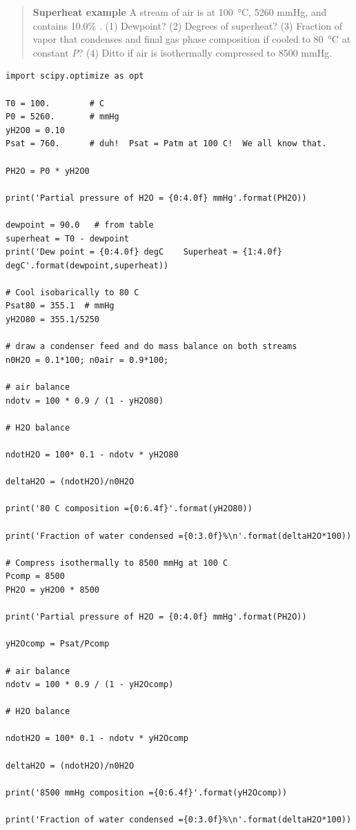 \documentclass[11pt]{article}
\begin{document}
\begin{quote}
\textbf{Superheat example}  A stream of air is at \SI{100}{\celsius}, 5260 mmHg, and contains 10.0\% .  (1) Dewpoint?  (2) Degrees of superheat?  (3) Fraction of vapor that condenses and final gas phase composition if cooled to \SI{80}{\celsius} at constant \emph{P}?  (4) Ditto if air is isothermally compressed to 8500 mmHg.
\end{quote}

\begin{verbatim}
import scipy.optimize as opt

T0 = 100.        # C
P0 = 5260.       # mmHg
yH2O0 = 0.10
Psat = 760.      # duh!  Psat = Patm at 100 C!  We all know that.

PH2O = P0 * yH2O0

print('Partial pressure of H2O = {0:4.0f} mmHg'.format(PH2O))

dewpoint = 90.0   # from table
superheat = T0 - dewpoint
print('Dew point = {0:4.0f} degC    Superheat = {1:4.0f} degC'.format(dewpoint,superheat))

# Cool isobarically to 80 C
Psat80 = 355.1  # mmHg
yH2O80 = 355.1/5250

# draw a condenser feed and do mass balance on both streams
n0H2O = 0.1*100; n0air = 0.9*100;

# air balance
ndotv = 100 * 0.9 / (1 - yH2O80)

# H2O balance

ndotH2O = 100* 0.1 - ndotv * yH2O80

deltaH2O = (ndotH2O)/n0H2O

print('80 C composition ={0:6.4f}'.format(yH2O80))

print('Fraction of water condensed ={0:3.0f}%\n'.format(deltaH2O*100))

# Compress isothermally to 8500 mmHg at 100 C
Pcomp = 8500
PH2O = yH2O0 * 8500

print('Partial pressure of H2O = {0:4.0f} mmHg'.format(PH2O))

yH2Ocomp = Psat/Pcomp

# air balance
ndotv = 100 * 0.9 / (1 - yH2Ocomp)

# H2O balance

ndotH2O = 100* 0.1 - ndotv * yH2Ocomp

deltaH2O = (ndotH2O)/n0H2O

print('8500 mmHg composition ={0:6.4f}'.format(yH2Ocomp))

print('Fraction of water condensed ={0:3.0f}%\n'.format(deltaH2O*100))
\end{verbatim}
\end{document}
